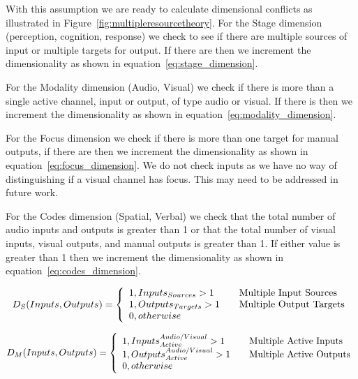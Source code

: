 With this assumption we are ready to calculate dimensional conflicts as illustrated in Figure~\ref{fig:multipleresourcetheory}.
For the Stage dimension (perception, cognition, response) we check to see if there are multiple sources of input or multiple targets for output.  If there are then we increment the dimensionality as shown in equation~\ref{eq:stage_dimension}.  

For the Modality dimension (Audio, Visual) we check if there is more than a single active channel, input or output, of type audio or visual.  If there is then we increment the dimensionality as shown in equation~\ref{eq:modality_dimension}.

For the Focus dimension we check if there is more than one target for manual outputs, if there are then we increment the dimensionality as shown in equation~\ref{eq:focus_dimension}.  We do not check inputs as we have no way of distinguishing if a visual channel has focus.  This may need to be addressed in future work. 

For the Codes dimension (Spatial, Verbal) we check that the total number of audio inputs and outputs is greater than 1 or that the total number of visual inputs, visual outputs, and manual outputs is greater than 1.  If either value is greater than 1 then we increment the dimensionality as shown in equation~\ref{eq:codes_dimension}.


\begin{equation}
D_{S}(Inputs, Outputs) = \left\{ 
  \begin{array}{l l}
    1, Inputs_{Sources} > 1 & \quad \text{Multiple Input Sources}\\
    1, Outputs_{Targets} > 1 & \quad \text{Multiple Output Targets}\\
    0, otherwise
  \end{array}
  \right.
  \label{eq:stage_dimension}
\end{equation}

\begin{equation}
D_{M}(Inputs, Outputs) = \left\{ 
  \begin{array}{l l}
    1, Inputs_{Active}^{Audio/Visual} > 1 & \quad \text{Multiple Active Inputs}\\
    1, Outputs_{Active}^{Audio/Visual} > 1 & \quad \text{Multiple Active Outputs}\\
    0, otherwise
  \end{array}
  \right.
  \label{eq:modality_dimension}
\end{equation}

